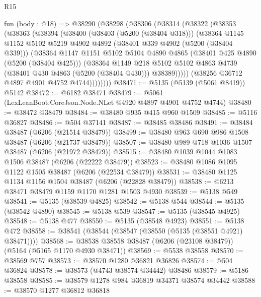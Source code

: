 \begin{lexlean}{R15}
\begin{coremodule}
{{{{{{{{{{{    fun (body : @18) =>
    @38290
      (@38298
        (@38306
          (@38314
            (@38322
              (@38353
                (@38363
                  (@38394
                    (@38400
                      (@38403 (@5200 (@38404 @318)))
                      (@38364
                        @1145
                        @1152
                        @5102
                        @5219
                        @4902
                        @4892
                        (@38401 @339 @4902 (@5200 (@38404 @339)))
                        (@38364
                          @1147
                          @1151
                          @5102
                          @5104
                          @4890
                          @4865
                          (@38401 @425 @4890 (@5200 (@38404 @425)))
                          (@38364
                            @1149
                            @218
                            @5102
                            @5102
                            @4863
                            @4739
                            (@38401 @430 @4863 (@5200 (@38404 @430)))
                            @38389)))))
                  (@38256 @36712 @4897 @4901 @4752 @4744))))))))
@38471 := @5135 (@5139 (@5061 @8419)) @5142
@38472 := @6182 @38471
@38479 := @5061 (LexLeanBoot.CoreJson.Node.NLet @4920 @4897 @4901 @4752 @4744)
@38480 := @38472 @38479
@38484 := @38480 @935 @415 @960 @1509
@38485 := @5116 @36827
@38486 := @504 @37141
@38487 := @38485 @38486
@38491 := @38484 @38487 (@6206 (@21514 @38479))
@38499 := @38480 @963 @690 @986 @1508 @38487 (@6206 (@21737 @38479))
@38507 := @38480 @989 @718 @1036 @1507 @38487 (@6206 (@21972 @38479))
@38515 := @38480 @1039 @1044 @1083 @1506 @38487 (@6206 (@22222 @38479))
@38523 := @38480 @1086 @1095 @1122 @1505 @38487 (@6206 (@22534 @38479))
@38531 := @38480 @1125 @1134 @1156 @1504 @38487 (@6206 (@22828 @38479))
@38538 := @6213 @38471 @38479 @1159 @1170 @1281 @1503 @4930
@38539 := @5138 @549
@38541 := @5135 (@38539 @4825)
@38542 := @5138 @544
@38544 := @5135 (@38542 @4890)
@38545 := @5138 @539
@38547 := @5135 (@38545 @4925)
@38548 := @5138 @477
@38550 := @5135 (@38548 @4923)
@38551 := @5138 @472
@38558 := @38541 (@38544 (@38547 (@38550 (@5135 (@38551 @4921) @38471))))
@38568 := @38538 @38558 @38487 (@6206 (@23108 @38479)) (@5164 (@5165 @1170 @4930 @38471))
@38569 := @5538 @38558
@38570 := @38569 @757
@38573 := @38570 @1280 @36821 @36826
@38574 := @504 @36824
@38578 := @38573 (@4743 @38574 @34442) @38486
@38579 := @5186 @38558
@38585 := @38579 @1278 @984 @36819 @34371 @38574 @34442
@38588 := @38570 @1277 @36812 @36818
}}}}}}}}}}}
\end{coremodule}
\end{lexlean}
